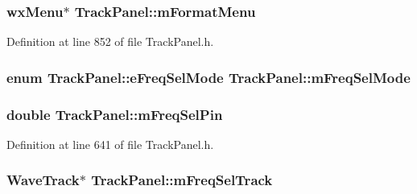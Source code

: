 \subsubsection[{\texorpdfstring{m\+Format\+Menu}{mFormatMenu}}]{\setlength{\rightskip}{0pt plus 5cm}wx\+Menu$\ast$ Track\+Panel\+::m\+Format\+Menu\hspace{0.3cm}{\ttfamily [protected]}}\hypertarget{class_track_panel_aed53844c5faeabefd25618317866160a}{}\label{class_track_panel_aed53844c5faeabefd25618317866160a}


Definition at line 852 of file Track\+Panel.\+h.

\subsubsection[{\texorpdfstring{m\+Freq\+Sel\+Mode}{mFreqSelMode}}]{\setlength{\rightskip}{0pt plus 5cm}enum {\bf Track\+Panel\+::e\+Freq\+Sel\+Mode}   Track\+Panel\+::m\+Freq\+Sel\+Mode\hspace{0.3cm}{\ttfamily [protected]}}\hypertarget{class_track_panel_a7001647bc10f3a935bc31f1afeb6ce53}{}\label{class_track_panel_a7001647bc10f3a935bc31f1afeb6ce53}
\subsubsection[{\texorpdfstring{m\+Freq\+Sel\+Pin}{mFreqSelPin}}]{\setlength{\rightskip}{0pt plus 5cm}double Track\+Panel\+::m\+Freq\+Sel\+Pin\hspace{0.3cm}{\ttfamily [protected]}}\hypertarget{class_track_panel_a4c34df1995d225287fa9140e4cb42ef4}{}\label{class_track_panel_a4c34df1995d225287fa9140e4cb42ef4}


Definition at line 641 of file Track\+Panel.\+h.

\subsubsection[{\texorpdfstring{m\+Freq\+Sel\+Track}{mFreqSelTrack}}]{ {\bf Wave\+Track}$\ast$ Track\+Panel\+::m\+Freq\+Sel\+Track\hspace{0.3cm}{\ttfamily [protected]}}\hypertarget{class_track_panel_ad7968d9248b67245cfb4182255d1de48}{}\label{class_track_panel_ad7968d9248b67245cfb4182255d1de48}


